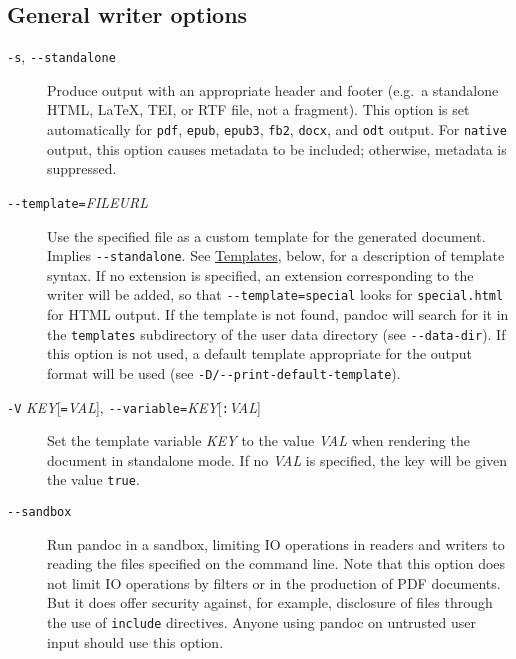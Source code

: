 \documentclass[
]{article}
\begin{document}
\hypertarget{general-writer-options}{%
\subsection{General writer options}\label{general-writer-options}}

\begin{description}
\item[\texttt{-s}, \texttt{-\/-standalone}]
Produce output with an appropriate header and footer (e.g.~a standalone
HTML, LaTeX, TEI, or RTF file, not a fragment). This option is set
automatically for \texttt{pdf}, \texttt{epub}, \texttt{epub3},
\texttt{fb2}, \texttt{docx}, and \texttt{odt} output. For
\texttt{native} output, this option causes metadata to be included;
otherwise, metadata is suppressed.
\item[\texttt{-\/-template=}\emph{FILE}\textbar{}\emph{URL}]
Use the specified file as a custom template for the generated document.
Implies \texttt{-\/-standalone}. See
\protect\hyperlink{templates}{Templates}, below, for a description of
template syntax. If no extension is specified, an extension
corresponding to the writer will be added, so that
\texttt{-\/-template=special} looks for \texttt{special.html} for HTML
output. If the template is not found, pandoc will search for it in the
\texttt{templates} subdirectory of the user data directory (see
\texttt{-\/-data-dir}). If this option is not used, a default template
appropriate for the output format will be used (see
\texttt{-D/-\/-print-default-template}).
\item[\texttt{-V} \emph{KEY}{[}\texttt{=}\emph{VAL}{]},
\texttt{-\/-variable=}\emph{KEY}{[}\texttt{:}\emph{VAL}{]}]
Set the template variable \emph{KEY} to the value \emph{VAL} when
rendering the document in standalone mode. If no \emph{VAL} is
specified, the key will be given the value \texttt{true}.
\item[\texttt{-\/-sandbox}]
Run pandoc in a sandbox, limiting IO operations in readers and writers
to reading the files specified on the command line. Note that this
option does not limit IO operations by filters or in the production of
PDF documents. But it does offer security against, for example,
disclosure of files through the use of \texttt{include} directives.
Anyone using pandoc on untrusted user input should use this option.


\end{description}
\end{document}
